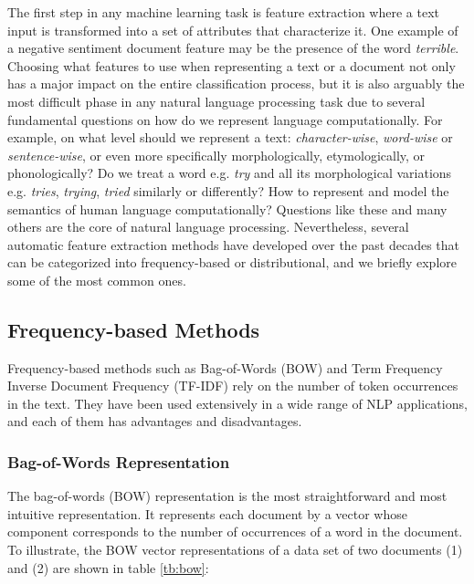 The first step in any machine learning task is feature extraction where a text input is transformed into a set of attributes that characterize it. One example of a negative sentiment document feature may be the presence of the word \emph{terrible}. Choosing what features to use when representing a text or a document not only has a major impact on the entire classification process, but it is also arguably the most difficult phase in any natural language processing task due to several fundamental questions on how do we represent language computationally. For example, on what level should we represent a text: \emph{character-wise}, \emph{word-wise} or \emph{sentence-wise}, or even more specifically morphologically, etymologically, or phonologically? Do we treat a word e.g. \emph{try} and all its morphological variations e.g. \emph{tries}, \emph{trying}, \emph{tried} similarly or differently? How to represent and model the semantics of human language computationally? Questions like these and many others are the core of natural language processing. Nevertheless, several automatic feature extraction methods have developed over the past decades that can be categorized into frequency-based or distributional, and we briefly explore some of the most common ones.

\subsection{Frequency-based Methods}

Frequency-based methods such as Bag-of-Words (BOW) and Term Frequency Inverse Document Frequency (TF-IDF) rely on the number of token occurrences in the text. They have been used extensively in a wide range of NLP applications, and each of them has advantages and disadvantages. 
\subsubsection*{Bag-of-Words Representation}

The bag-of-words (BOW) representation is the most straightforward and most intuitive
representation. It represents each document by a vector
whose component corresponds to the number of occurrences of a word in
the document.  To illustrate, the BOW vector representations of a data set of two documents (1) and (2) are shown in table \ref{tb:bow}:

